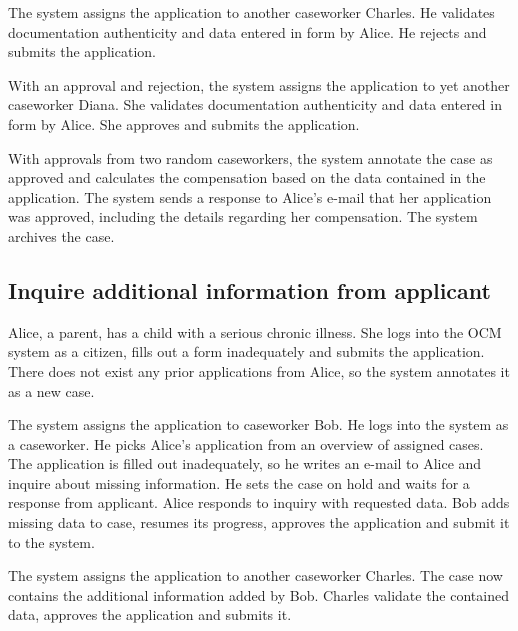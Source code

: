 \documentclass{article}
\begin{document}
\vspace{2mm}

The system assigns the application to another caseworker Charles. He validates documentation authenticity and data entered in form by Alice. He rejects and submits the application.

\vspace{2mm}

With an approval and rejection, the system assigns the application to yet another caseworker Diana. She validates documentation authenticity and data entered in form by Alice. She approves and submits the application.

\vspace{2mm}

With approvals from two random caseworkers, the system annotate the case as approved and calculates the compensation based on the data contained in the application. The system sends a response to Alice's e-mail that her application was approved, including the details regarding her compensation. The system archives the case.

\subsection*{Inquire additional information from applicant}

Alice, a parent, has a child with a serious chronic illness. She logs into the OCM system as a citizen, fills out a form inadequately and submits the application. There does not exist any prior applications from Alice, so the system annotates it as a new case.

\vspace{2mm}

The system assigns the application to caseworker Bob. He logs into the system as a caseworker. He picks Alice's application from an overview of assigned cases. The application is filled out inadequately, so he writes an e-mail to Alice and inquire about missing information. He sets the case on hold and waits for a response from applicant. Alice responds to inquiry with requested data. Bob adds missing data to case, resumes its progress, approves the application and submit it to the system.

\vspace{2mm}

The system assigns the application to another caseworker Charles. The case now contains the additional information added by Bob. Charles validate the contained data, approves the application and submits it.
\end{document}
